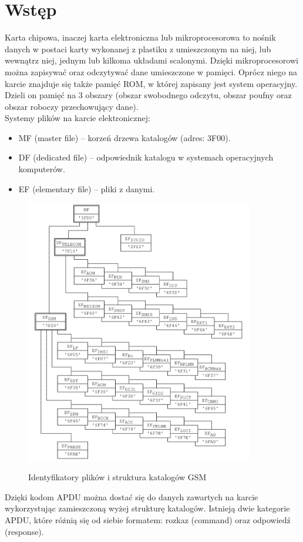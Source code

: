\documentclass{article}
\begin{document}
\section{Wstęp}
Karta chipowa, inaczej karta elektroniczna lub mikroprocesorowa to nośnik danych w postaci karty wykonanej z plastiku z umieszczonym na niej, lub wewnątrz niej, jednym lub kilkoma układami scalonymi.\citep{wiki}
Dzięki mikroprocesorowi można zapisywać oraz odczytywać dane umieszczone w pamięci. Oprócz niego na karcie znajduje się także pamięć ROM, w której zapisany jest system operacyjny. Dzieli on pamięć na 3 obszary (obszar swobodnego odczytu, obszar poufny oraz obszar roboczy przechowujący dane).\bigskip\\ 
Systemy plików na karcie elektronicznej: 
\begin{itemize}
    \item MF (master file) – korzeń drzewa katalogów (adres: 3F00).
    \item DF (dedicated file) – odpowiednik katalogu w systemach operacyjnych komputerów.
    \item EF (elementary file) – pliki z danymi.
\end{itemize}
\begin{figure}[ht]
\centering
\includegraphics[width = 10cm]{directory_structure.png}
\caption{Identyfikatory plików i struktura katalogów GSM}\citep{gsmTechSpecs}
\label{fig:directory_structure}
\end{figure}
\bigskip 
Dzięki kodom APDU można dostać się do danych zawartych na karcie wykorzystując zamieszczoną wyżej strukturę katalogów. Istnieją dwie kategorie APDU, które różnią się od siebie formatem: rozkaz (command) oraz odpowiedź (response).
\end{document}

